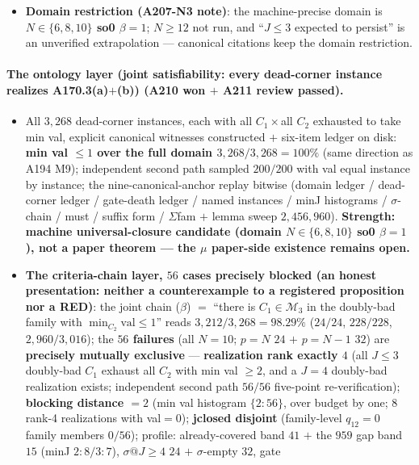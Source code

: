 \begin{itemize}
\item \textbf{Domain restriction (A207-N3 note)}: the machine-precise domain
is \textbf{$N\in\{6,8,10\}$ so0 $\beta=1$}; $N\ge12$ not run, and ``$J\le3$
expected to persist'' is an unverified extrapolation --- canonical citations
keep the domain restriction.
\end{itemize}

\paragraph{The ontology layer (joint satisfiability: every dead-corner
instance realizes A170.3(a)$+$(b)) \tierMUCC{} (A210 won $+$ A211 review
passed).}
\begin{itemize}
\item All $3{,}268$ dead-corner instances, each with all $C_1\times$all
$C_2$ exhausted to take min val, explicit canonical witnesses constructed
$+$ six-item ledger on disk: \textbf{min val $\le1$ over the full domain
$3{,}268/3{,}268=100\%$} (same direction as A194 M9); independent second
path sampled $200/200$ with val equal instance by instance; the
nine-canonical-anchor replay bitwise (domain ledger / dead-corner ledger /
gate-death ledger / named instances / minJ histograms / $\sigma$-chain /
must / suffix form / $\Sigma$fam $+$ lemma sweep $2{,}456{,}960$).
\textbf{Strength: machine universal-closure candidate (domain
$N\in\{6,8,10\}$ so0 $\beta=1$), not a paper theorem --- the $\mu$
paper-side existence remains open.}
\item \textbf{The criteria-chain layer, $56$ cases precisely blocked (an
honest presentation: neither a counterexample to a registered proposition
nor a RED)}: the joint chain ($\beta$) $=$ ``there is $C_1\in\mathcal{M}_3$
in the doubly-bad family with $\min_{C_2}\mathrm{val}\le1$'' reads
\textbf{$3{,}212/3{,}268=98.29\%$} ($24/24$, $228/228$, $2{,}960/3{,}016$);
the \textbf{$56$ failures} (all $N=10$; $p=N$ $24$ $+$ $p=N-1$ $32$) are
\textbf{precisely mutually exclusive} --- \textbf{realization rank exactly
$4$} (all $J\le3$ doubly-bad $C_1$ exhaust all $C_2$ with min val $\ge2$,
and a $J=4$ doubly-bad realization exists; independent second path $56/56$
five-point re-verification); \textbf{blocking distance $=2$} (min val
histogram $\{2{:}56\}$, over budget by one; $8$ rank-4 realizations with
val$=0$); \textbf{jclosed disjoint} (family-level $q_{12}=0$ family members
$0/56$); profile: already-covered band $41$ $+$ the $959$ gap band $15$
(minJ $2{:}8/3{:}7$), $\sigma@J\ge4$ $24$ $+$ $\sigma$-empty $32$, gate

\end{itemize}
